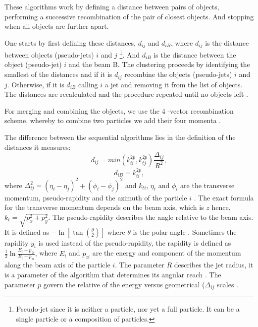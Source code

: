 These algorithms work by defining a distance between pairs of objects, performing a successive recombination of the pair of closest objects. And stopping when all objects are further apart. 

One starts by first defining these distances, $d_{ij}$ and $d_{iB}$, where $d_{ij}$ is the distance between objects (pseudo-jets) $i$ and $j$ \footnote{Pseudo-jet since it is neither a particle, nor yet a full particle. It can be a single particle or a composition of particles.}. And $d_{iB}$ is the distance between the object (pseudo-jet) $i$ and the beam B. The clustering proceeds by identifying the smallest of the distances and if it is $d_{ij}$ recombine the objects (pseudo-jets) $i$ and $j$. Otherwise, if it is $d_{iB}$ calling $i$ a jet and removing it from the list of objects. The distances are recalculated and the procedure repeated until no objects left \citep{Cacciari:2008gp}. 

For merging and combining the objects, we use the 4 -vector recombination scheme, whereby to combine two particles we add their four momenta \citep{Blazey:2000qt}. 

The difference between the sequential algorithms lies in the definition of the distances it measures:
\begin{equation}
d_{ij} = min(k_{ti}^{2p}, k_{tj}^{2p}) \frac{\Delta_{ij}}{R^{2}},
\end{equation}         
\begin{equation}
d_{iB} = k_{ti}^{2p} ,
\end{equation}
where $\Delta_{ij}^{2} = (\eta_{i} - \eta_{j})^2 + (\phi_{i} - \phi_{j})^2$ and $k_{ti}$, $\eta_{i}$ and $\phi_{i}$ are the transverse momentum, pseudo-rapidity and  the azimuth of the particle $i$ \citep{Cacciari:2008gp}. The exact formula for the transverse momentum depends on the beam axis, which is $z$ hence, $k_{t} = \sqrt{p_x^2 + p_y^2}$. The pseudo-rapidity describes the angle relative to the beam axis. It is defined as $- \ln \left[\tan\left(\frac{\theta}{2}\right)\right]$ where $\theta$ is the polar angle  \citep{Salam:2009jx}. Sometimes the rapidity $y_i$ is used instead of the pseudo-rapidity, the rapidity is defined as $\frac{1}{2} \ln \frac{E_i + p_{zi}}{E_i - p_{zi}}$, where  $E_i$ and $p_{zi}$ are the energy and component of the momentum along the beam axis of the particle $i$\citep{Cacciari:2011ma}. The parameter $R$ describes the jet radius, it is a parameter of the algorithm that determines its angular reach \citep{Cacciari:2011ma}. The parameter $p$ govern the relative of the energy versus geometrical ($\Delta_{ij}$ scales \citep{Cacciari:2008gp}. 

